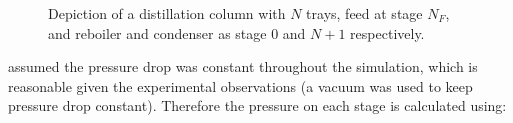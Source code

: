 \begin{figure}
    \caption{Depiction of a distillation column with $N$ trays, feed at stage $N_F$, and reboiler and condenser as stage 0 and $N+1$ respectively.}
    \label{fig:column}
\end{figure}




assumed the pressure drop was constant throughout the simulation, which is reasonable given the experimental observations (a vacuum was used to keep pressure drop constant). Therefore the pressure on each stage is calculated using:


